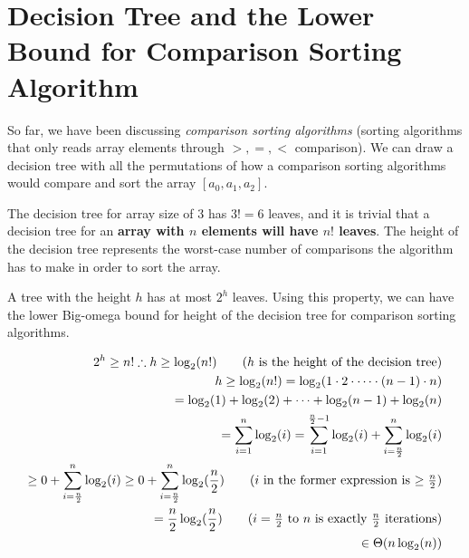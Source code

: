 \documentclass{report}
\begin{document}
\section[Comparison Sorting Algo Lower Bound]{Decision Tree and the Lower Bound for Comparison Sorting Algorithm }

So far, we have been discussing \textit{comparison sorting algorithms} (sorting algorithms that only reads array elements through $>, =, <$ comparison). We can draw a decision tree with all the permutations of how a comparison sorting algorithms would compare and sort the array $[a_{0}, a_{1}, a_{2}]$.

\begin{center}
\end{center}

The decision tree for array size of 3 has $3! = 6$ leaves, and it is trivial that a decision tree for an \textbf{array with $n$ elements will have $n!$ leaves}. The height of the decision tree represents the worst-case number of comparisons the algorithm has to make in order to sort the array.

A tree with the height $h$ has at most $2^{h}$ leaves. Using this property, we can have the lower Big-omega bound for height of the decision tree for comparison sorting algorithms.

\begin{align*}
  2^{h} \geq n! \therefore h \geq \log_{2}(n!) \tag{$h$ is the height of the decision tree} \\
  h \geq \log_{2}(n!) = \log_{2}(1 \cdot 2 \cdot \cdots \cdot (n - 1) \cdot n) \\
  = \log_{2}(1) + \log_{2}(2) + \cdots + \log_{2}(n - 1) + \log_{2}(n) \\
  = \sum_{i = 1}^{n} \log_{2}(i) = \sum_{i = 1}^{\frac{n}{2} - 1} \log_{2}(i) + \sum_{i = \frac{n}{2}}^{n} \log_{2}(i) \\
  \geq 0 + \sum_{i = \frac{n}{2}}^{n} \log_{2}(i) \geq 0 + \sum_{i = \frac{n}{2}}^{n} \log_{2}(\frac{n}{2}) \tag{$i$ in the former expression is $\geq \frac{n}{2}$} \\
  = \frac{n}{2} \log_{2}(\frac{n}{2}) \tag{$i = \frac{n}{2}$ to $n$ is exactly $\frac{n}{2}$ iterations} \\
  \in \Theta(n \log_{2}(n))
\end{align*}
\end{document}

